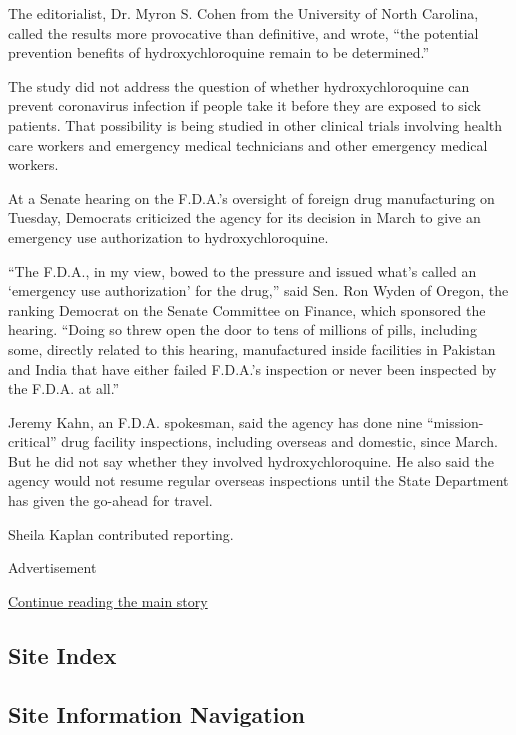 The editorialist, Dr. Myron S. Cohen from the University of North
Carolina, called the results more provocative than definitive, and
wrote, ``the potential prevention benefits of hydroxychloroquine remain
to be determined.''

The study did not address the question of whether hydroxychloroquine can
prevent coronavirus infection if people take it before they are exposed
to sick patients. That possibility is being studied in other clinical
trials involving health care workers and emergency medical technicians
and other emergency medical workers.

At a Senate hearing on the F.D.A.'s oversight of foreign drug
manufacturing on Tuesday, Democrats criticized the agency for its
decision in March to give an emergency use authorization to
hydroxychloroquine.

``The F.D.A., in my view, bowed to the pressure and issued what's called
an `emergency use authorization' for the drug,'' said Sen. Ron Wyden of
Oregon, the ranking Democrat on the Senate Committee on Finance, which
sponsored the hearing. ``Doing so threw open the door to tens of
millions of pills, including some, directly related to this hearing,
manufactured inside facilities in Pakistan and India that have either
failed F.D.A.'s inspection or never been inspected by the F.D.A. at
all.''

Jeremy Kahn, an F.D.A. spokesman, said the agency has done nine
``mission-critical'' drug facility inspections, including overseas and
domestic, since March. But he did not say whether they involved
hydroxychloroquine. He also said the agency would not resume regular
overseas inspections until the State Department has given the go-ahead
for travel.

Sheila Kaplan contributed reporting.

Advertisement

\protect\hyperlink{after-bottom}{Continue reading the main story}

\hypertarget{site-index}{%
\subsection{Site Index}\label{site-index}}

\hypertarget{site-information-navigation}{%
\subsection{Site Information
Navigation}\label{site-information-navigation}}


